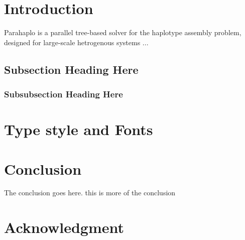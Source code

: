 \documentclass[10pt, conference, compsocconf]{IEEEtran}
\begin{document}
 
\section{Introduction} 
Parahaplo is a parallel tree-based solver for the haplotype assembly problem, designed for large-scale
hetrogenous systems ...
 
\subsection{Subsection Heading Here} 
 
\subsubsection{Subsubsection Heading Here} 
 
\section{Type style and Fonts} 

\section{Conclusion} 
The conclusion goes here. this is more of the conclusion 
 
 
\section*{Acknowledgment} 

  
  


% 
% 
 
\end{document}
